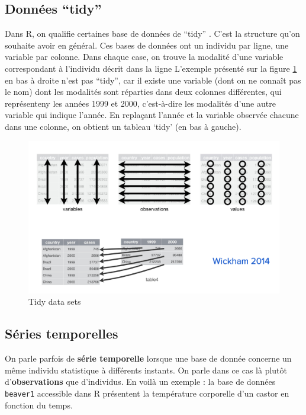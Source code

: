 \documentclass[
]{book}
\begin{document}
\hypertarget{donnuxe9es-tidy}{%
\subsection{Données ``tidy''}\label{donnuxe9es-tidy}}

Dans R, on qualifie certaines base de données de ``tidy'' \citep{wickham2014}. C'est la structure qu'on souhaite avoir en général. Ces bases de données ont un individu par ligne, une variable par colonne. Dans chaque case, on trouve la modalité d'une variable correspondant à l'individu décrit dans la ligne L'exemple présenté sur la figure \ref{fig:tidy} en bas à droite n'est pas ``tidy'', car il existe une variable (dont on ne connaît pas le nom) dont les modalités sont réparties dans deux colonnes différentes, qui représenteny les années 1999 et 2000, c'est-à-dire les modalités d'une autre variable qui indique l'année. En replaçant l'année et la variable observée chacune dans une colonne, on obtient un tableau `tidy' (en bas à gauche).

\begin{figure}
\includegraphics[width=22.36in]{docs/images/tidy} \caption{Tidy data sets}\label{fig:tidy}
\end{figure}

\hypertarget{suxe9ries-temporelles}{%
\subsection{Séries temporelles}\label{suxe9ries-temporelles}}

On parle parfois de \textbf{série temporelle} lorsque une base de donnée concerne un même individu statistique à différents instants. On parle dans ce cas là plutôt d'\textbf{observations} que d'individus. En voilà un exemple : la base de données \texttt{beaver1} accessible dans R présentent la température corporelle d'un castor en fonction du temps.
\end{document}
